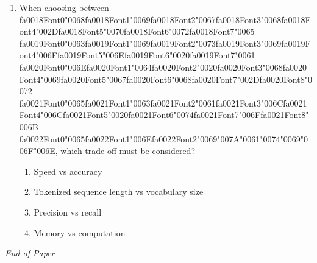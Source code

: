\documentclass[12pt]{article}
\begin{document}
\begin{enumerate}[label=Q\arabic*.]
\begin{enumerate}[label=(\Alph*)]
    \item It cannot represent overlapping or nested entities
    \item It requires too many labels
    \item It does not support multiple entity types
    \item It ignores entity boundaries
\end{enumerate}
\item When choosing between {\csname fa0018Font0\endcsname\char"0068}{\csname fa0018Font1\endcsname\char"0069}{\csname fa0018Font2\endcsname\char"0067}{\csname fa0018Font3\endcsname\char"0068}{\csname fa0018Font4\endcsname\char"002D}{\csname fa0018Font5\endcsname\char"0070}{\csname fa0018Font6\endcsname\char"0072}{\csname fa0018Font7\endcsname\char"0065} {\csname fa0019Font0\endcsname\char"0063}{\csname fa0019Font1\endcsname\char"0069}{\csname fa0019Font2\endcsname\char"0073}{\csname fa0019Font3\endcsname\char"0069}{\csname fa0019Font4\endcsname\char"006F}{\csname fa0019Font5\endcsname\char"006E}{\csname fa0019Font6\endcsname\char"0020}{\csname fa0019Font7\endcsname\char"0061} {\csname fa0020Font0\endcsname\char"006E}{\csname fa0020Font1\endcsname\char"0064}{\csname fa0020Font2\endcsname\char"0020}{\csname fa0020Font3\endcsname\char"0068}{\csname fa0020Font4\endcsname\char"0069}{\csname fa0020Font5\endcsname\char"0067}{\csname fa0020Font6\endcsname\char"0068}{\csname fa0020Font7\endcsname\char"002D}{\csname fa0020Font8\endcsname\char"0072} {\csname fa0021Font0\endcsname\char"0065}{\csname fa0021Font1\endcsname\char"0063}{\csname fa0021Font2\endcsname\char"0061}{\csname fa0021Font3\endcsname\char"006C}{\csname fa0021Font4\endcsname\char"006C}{\csname fa0021Font5\endcsname\char"0020}{\csname fa0021Font6\endcsname\char"0074}{\csname fa0021Font7\endcsname\char"006F}{\csname fa0021Font8\endcsname\char"006B} {\csname fa0022Font0\endcsname\char"0065}{\csname fa0022Font1\endcsname\char"006E}{\csname fa0022Font2\endcsname\char"0069}{\char"007A}{\char"0061}{\char"0074}{\char"0069}{\char"006F}{\char"006E}, which trade-off must be considered?
\begin{enumerate}[label=(\Alph*)]
    \item Speed vs accuracy
    \item Tokenized sequence length vs vocabulary size
    \item Precision vs recall
    \item Memory vs computation
\end{enumerate}
\end{enumerate}

\vfill
\noindent\textit{End of Paper}
\end{document}
